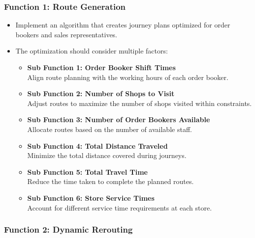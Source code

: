 \subsubsection*{Function 1: Route Generation}
\begin{itemize}
    \item Implement an algorithm that creates journey plans optimized for order bookers and sales representatives.
    \item The optimization should consider multiple factors:
    \begin{itemize}
        \item[] \textbf{Sub Function 1: Order Booker Shift Times} \\
            Align route planning with the working hours of each order booker.
        \item[] \textbf{Sub Function 2: Number of Shops to Visit} \\
            Adjust routes to maximize the number of shops visited within constraints.
        \item[] \textbf{Sub Function 3: Number of Order Bookers Available} \\
            Allocate routes based on the number of available staff.
        \item[] \textbf{Sub Function 4: Total Distance Traveled} \\
            Minimize the total distance covered during journeys.
        \item[] \textbf{Sub Function 5: Total Travel Time} \\
            Reduce the time taken to complete the planned routes.
        \item[] \textbf{Sub Function 6: Store Service Times} \\
            Account for different service time requirements at each store.
    \end{itemize}
\end{itemize}

\subsubsection*{Function 2: Dynamic Rerouting}


